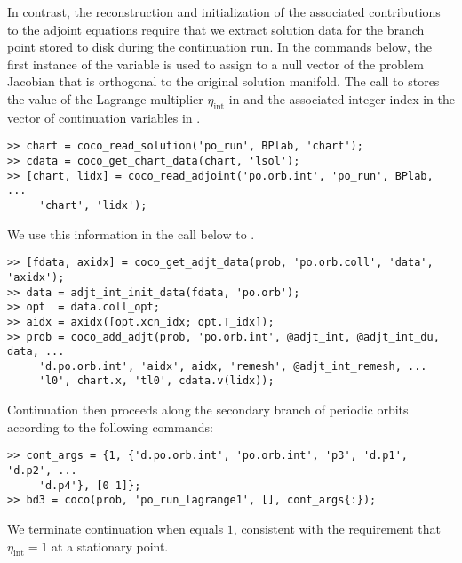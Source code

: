 In contrast, the reconstruction and initialization of the associated contributions to the adjoint equations require that we extract solution data for the branch point stored to disk during the  continuation run. In the commands below, the first instance of the  variable is used to assign to  a null vector of the problem Jacobian that is orthogonal to the original solution manifold. The call to  stores the value of the Lagrange multiplier $\eta_\mathrm{int}$ in  and the associated integer index in the vector of continuation variables in .
\begin{lstlisting}[language=coco-highlight]
>> chart = coco_read_solution('po_run', BPlab, 'chart');
>> cdata = coco_get_chart_data(chart, 'lsol');
>> [chart, lidx] = coco_read_adjoint('po.orb.int', 'po_run', BPlab, ...
     'chart', 'lidx');
\end{lstlisting}
We use this information in the call below to .
\begin{lstlisting}[language=coco-highlight]
>> [fdata, axidx] = coco_get_adjt_data(prob, 'po.orb.coll', 'data', 'axidx');
>> data = adjt_int_init_data(fdata, 'po.orb');
>> opt  = data.coll_opt;
>> aidx = axidx([opt.xcn_idx; opt.T_idx]);
>> prob = coco_add_adjt(prob, 'po.orb.int', @adjt_int, @adjt_int_du, data, ...
     'd.po.orb.int', 'aidx', aidx, 'remesh', @adjt_int_remesh, ...
     'l0', chart.x, 'tl0', cdata.v(lidx));
\end{lstlisting}
Continuation then proceeds along the secondary branch of periodic orbits according to the following commands:
\begin{lstlisting}[language=coco-highlight]
>> cont_args = {1, {'d.po.orb.int', 'po.orb.int', 'p3', 'd.p1', 'd.p2', ...
     'd.p4'}, [0 1]};
>> bd3 = coco(prob, 'po_run_lagrange1', [], cont_args{:});
\end{lstlisting}
We terminate continuation when  equals $1$, consistent with the requirement that $\eta_\mathrm{int}=1$ at a stationary point.

